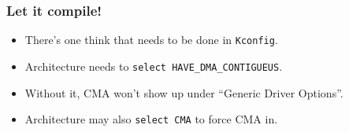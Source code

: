 \begin{frame}
  \frametitle{Let it compile!}

  \begin{itemize}
  \item There's one think that needs to be done in \lstinline|Kconfig|.
  \item Architecture needs to \lstinline|select HAVE_DMA_CONTIGUEUS|.
  \item Without it, CMA won't show up under “Generic Driver Options”.
  \item Architecture may also \lstinline|select CMA| to force CMA in.
  \end{itemize}
\end{frame}
